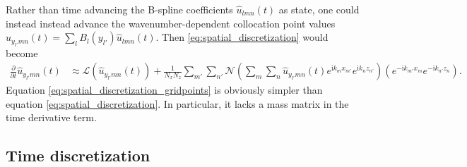 \documentclass[letterpaper,11pt,nointlimits,reqno,draft]{amsart}
\newcommand{\ii}{\ensuremath{\mathrm{i}}}
\begin{document}
Rather than time advancing the B-spline coefficients $\hat{u}_{l m n}(t)$ as
state, one could instead instead advance the wavenumber-dependent collocation
point values $\hat{u}_{y_{l'} m n}(t) = \sum_{l} B_l\!\left(y_{l'}\right)
\hat{u}_{l m n}(t)$.  Then \eqref{eq:spatial_discretization} would become
\begin{align}
  \frac{\partial}{\partial{}t} \hat{u}_{y_{l'} m n}(t)
  &\approx
  \mathscr{L}\left(\hat{u}_{y_{l'} m n}(t)\right)
  +
  \frac{1}{N_x N_z}
  \sum_{m'} \sum_{n'}
  \mathscr{N}\left(
    \sum_{m}
    \sum_{n}
    \hat{u}_{y_{l'} m n}(t)
    e^{\ii k_m x_{m'}}e^{\ii k_n z_{n'}}
  \right)
  \left(
    e^{-\ii k_{m'} x_m}e^{-\ii k_{n'} z_n}
  \right)
  .
  \label{eq:spatial_discretization_gridpoints}
\end{align}
Equation \eqref{eq:spatial_discretization_gridpoints} is obviously simpler than
equation \eqref{eq:spatial_discretization}.  In particular, it lacks a mass
matrix in the time derivative term.

\subsection{Time discretization}
\label{sec:timediscretization}
\end{document}
